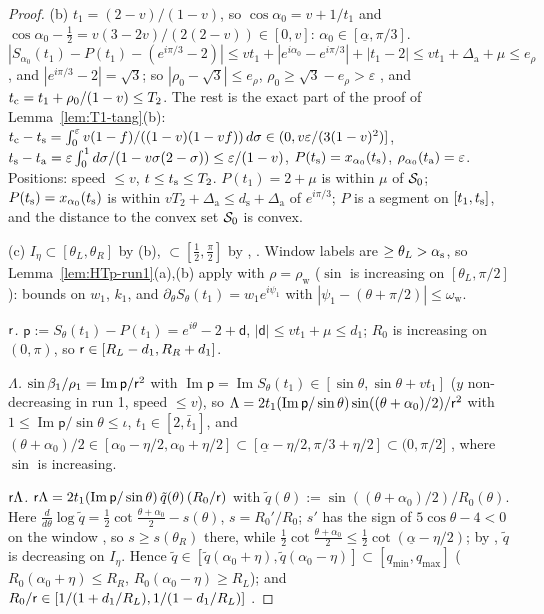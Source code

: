 \begin{proof}
(b) $t_1=(2-v)/(1-v)$, so $\cos\alpha_0=v+1/t_1$ and $\cos\alpha_0-\frac12=v(3-2v)/(2(2-v))\in[0,v]$: $\alpha_0\in[\underline\alpha,\pi/3]$.
$|S_{\alpha_0}(t_1)-P(t_1)-(e^{i\pi/3}-2)|\le vt_1+|e^{i\alpha_0}-e^{i\pi/3}|+|t_1-2|\le vt_1+\Delta_{\mathrm a}+\mu\le e_\rho$, and
$|e^{i\pi/3}-2|=\sqrt3$; so $|\rho_0-\sqrt3|\le e_\rho$, $\rho_0\ge\sqrt3-e_\rho>\varepsilon$ , and
$t_{\mathrm c}=t_1+\rho_0/(1-v)\le T_2$. The rest is the exact part of the proof of Lemma~\ref{lem:T1-tang}(b):
$t_{\mathrm c}-t_{\mathrm s}=\int_0^\varepsilon v(1-f)/((1-v)(1-vf))\,d\sigma\in(0,v\varepsilon/(3(1-v)^2)]$,
$t_{\mathrm s}-t_{\mathrm a}=\varepsilon\int_0^1d\sigma/(1-v\sigma(2-\sigma))\le\varepsilon/(1-v)$, $P(t_{\mathrm s})=x_{\alpha_0}(t_{\mathrm s})$,
$\rho_{\alpha_0}(t_{\mathrm a})=\varepsilon$. Positions: speed $\le v$, $t\le t_{\mathrm s}\le T_2$. $P(t_1)=2+\mu$ is within $\mu$ of $\mathcal S_0$;
$P(t_{\mathrm s})=x_{\alpha_0}(t_{\mathrm s})$ is within $vT_2+\Delta_{\mathrm a}\le d_{\mathrm s}+\Delta_{\mathrm a}$ of $e^{i\pi/3}$; $P$ is a segment on
$[t_1,t_{\mathrm s}]$, and the distance to the convex set $\mathcal S_0$ is convex.

(c) $I_\eta\subset[\theta_L,\theta_R]$ by (b), $\subset[\frac12,\frac\pi2]$ by , . Window labels are $\ge\theta_L>\alpha_{\mathrm s}$,
so Lemma~\ref{lem:HTp-run1}(a),(b) apply with $\rho=\rho_{\mathrm w}$ ($\sin$ is increasing on $[\theta_L,\pi/2]$): bounds on $w_1$,
$k_1$, and $\partial_\theta S_\theta(t_1)=w_1e^{i\psi_1}$ with $|\psi_1-(\theta+\pi/2)|\le\omega_{\mathrm w}$.

\emph{$\mathsf r$.} $\mathsf p:=S_\theta(t_1)-P(t_1)=e^{i\theta}-2+\mathsf d$, $|\mathsf d|\le vt_1+\mu\le d_1$; $R_0$ is increasing on
$(0,\pi)$, so $\mathsf r\in[R_L-d_1,R_R+d_1]$.

\emph{$\Lambda$.} $\sin\beta_1/\rho_1=\operatorname{Im}\mathsf p/\mathsf r^2$ with $\operatorname{Im}\mathsf p=\operatorname{Im}S_\theta(t_1)\in
[\sin\theta,\sin\theta+vt_1]$ ($y$ non-decreasing in run 1, speed $\le v$), so
$\Lambda=2t_1(\operatorname{Im}\mathsf p/\sin\theta)\sin((\theta+\alpha_0)/2)/\mathsf r^2$ with
$1\le\operatorname{Im}\mathsf p/\sin\theta\le\iota$, $t_1\in[2,\bar t_1]$, and
$(\theta+\alpha_0)/2\in[\alpha_0-\eta/2,\alpha_0+\eta/2]\subset[\underline\alpha-\eta/2,\pi/3+\eta/2]\subset(0,\pi/2]$ , where $\sin$
is increasing.

\emph{$\mathsf r\Lambda$.} $\mathsf r\Lambda=2t_1(\operatorname{Im}\mathsf p/\sin\theta)\,\tilde q(\theta)\,(R_0/\mathsf r)$ with
$\tilde q(\theta):=\sin((\theta+\alpha_0)/2)/R_0(\theta)$. Here $\frac d{d\theta}\log\tilde q=\frac12\cot\frac{\theta+\alpha_0}2-s(\theta)$,
$s=R_0'/R_0$; $s'$ has the sign of $5\cos\theta-4<0$ on the window , so $s\ge s(\theta_R)$ there, while
$\frac12\cot\frac{\theta+\alpha_0}2\le\frac12\cot(\underline\alpha-\eta/2)$; by , $\tilde q$ is decreasing on $I_\eta$. Hence
$\tilde q\in[\tilde q(\alpha_0+\eta),\tilde q(\alpha_0-\eta)]\subset[q_{\min},q_{\max}]$ ($R_0(\alpha_0+\eta)\le R_R$,
$R_0(\alpha_0-\eta)\ge R_L$); and $R_0/\mathsf r\in[1/(1+d_1/R_L),1/(1-d_1/R_L)]$ .


\end{proof}

